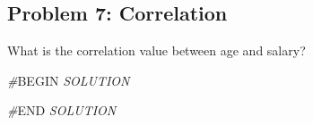 \documentclass[
]{article}
\newenvironment{Shaded}{\begin{snugshade}}{\end{snugshade}}
\newcommand{\CommentTok}[1]{\textcolor[rgb]{0.56,0.35,0.01}{\textit{#1}}}
\newcommand{\RegionMarkerTok}[1]{#1}
\begin{document}
\hypertarget{problem-7-correlation}{%
\subsection{Problem 7: Correlation}\label{problem-7-correlation}}

What is the correlation value between age and salary?

\begin{Shaded}
\begin{Highlighting}[]
\CommentTok{\#}\RegionMarkerTok{BEGIN}\CommentTok{ SOLUTION}

\CommentTok{\#}\RegionMarkerTok{END}\CommentTok{ SOLUTION}
\end{Highlighting}
\end{Shaded}
\end{document}
